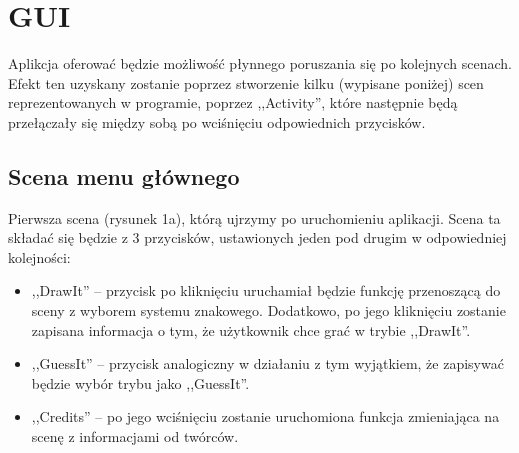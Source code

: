 \documentclass[15pt]{article}
\begin{document}
  \section{GUI}
  Aplikcja oferować będzie możliwość płynnego poruszania się po kolejnych scenach. Efekt ten uzyskany zostanie poprzez stworzenie kilku (wypisane poniżej) scen reprezentowanych w programie, poprzez ,,Activity'', które następnie będą przełączały się między sobą po wciśnięciu odpowiednich przycisków. 
  
  \subsection{Scena menu głównego}
  Pierwsza scena (rysunek 1a), którą ujrzymy po uruchomieniu aplikacji. Scena ta składać się będzie z 3 przycisków, ustawionych jeden pod drugim w odpowiedniej kolejności:
  \begin{itemize}
    \item ,,DrawIt'' -- przycisk po kliknięciu uruchamiał będzie funkcję przenoszącą do sceny z wyborem systemu znakowego. Dodatkowo, po jego kliknięciu zostanie zapisana informacja o tym, że użytkownik chce grać w trybie ,,DrawIt''.
    \item ,,GuessIt'' -- przycisk analogiczny w działaniu z tym wyjątkiem, że zapisywać będzie wybór trybu jako ,,GuessIt''.
    \item ,,Credits'' -- po jego wciśnięciu zostanie uruchomiona funkcja zmieniająca na scenę z informacjami od twórców.
  \end{itemize}
  
\end{document}
